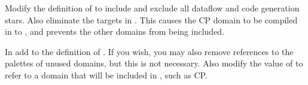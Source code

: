 Modify the definition of  to include 
and exclude all dataflow and code generation stars.  Also eliminate the
targets in .  This causes the CP domain to be compiled
in to , and prevents the other domains from being
included.


In  add 
to the definition of .  If you wish, you may also
remove references to the palettes of unused domains, but this is not
necessary.  Also modify the value of  to refer to
a domain that will be included in  , such as CP.
